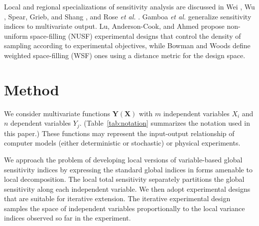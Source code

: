 \documentclass[12pt]{article}
\begin{document}
Local and regional specializations of sensitivity analysis are discussed in Wei \cite{wei_regional_2014}, Wu \cite{wu_application_2017}, Spear, Grieb, and Shang \cite{spear_parameter_1994}, and Rose \textit{et al.} \cite{rose_parameter_1991}. Gamboa \textit{et al.} \cite{gamboa_sensitivity_2013} generalize sensitivity indices to multivariate output. Lu, Anderson-Cook, and Ahmed \cite{lu_non-uniform_2020} propose non-uniform space-filling (NUSF) experimental designs that control the density of sampling according to experimental objectives, while Bowman and Woods \cite{bowman_weighted_2013} define weighted space-filling (WSF) ones using a distance metric for the design space.



\section{Method}

We consider multivariate functions $\mathbf{Y} \left( \mathbf{X} \right)$ with $m$ independent variables $X_i$ and $n$ dependent variables $Y_j$. (Table~\ref{tab:notation} summarizes the notation used in this paper.) These functions may represent the input-output relationship of computer models (either deterministic or stochastic) or physical experiments.

We approach the problem of developing local versions of variable-based global sensitivity indices by expressing the standard global indices \cite{saltelli_variance_2010} in forms amenable to local decomposition. The local total sensitivity separately partitions the global sensitivity along each independent variable. We then adopt experimental designs that are suitable for iterative extension. The iterative experimental design samples the space of independent variables proportionally to the local variance indices observed so far in the experiment.
\end{document}

